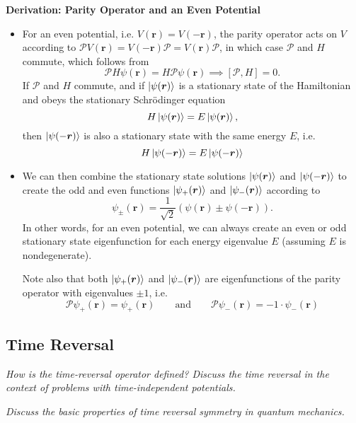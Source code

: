\documentclass[11pt, a4paper]{article}
\newcommand{\eqtext}[1]{\qquad \text{#1} \qquad}
\newcommand{\Schro}{Schr\"{o}dinger\xspace}
\newcommand{\Ham}{Hamiltonian\xspace}
\renewcommand{\vec}[1]{\bm{#1}}  %
\renewcommand{\r}{\vec{r}}  %
\newcommand{\Par}{\mathcal{P}}  %
\newcommand{\p}{\psi}  %
\renewcommand{\k}[1]{\ket{#1}}
\begin{document}
\textbf{Derivation: Parity Operator and an Even Potential}
\begin{itemize}
    \item For an even potential, i.e. $ V(\r) = V(-\r) $, the parity operator acts on $ V $ according to $ \Par V(\r) = V(-\r)\Par = V(\r)\Par $, in which case $ \Par $ and $ H $ commute, which follows from
	\begin{equation*}
		\Par H\p(\r) = H \Par \p(\r) \implies [\Par, H] = 0.
	\end{equation*}
	If $ \Par $ and $ H $ commute, and if $ \ket{\p(\r)} $ is a stationary state of the \Ham and obeys the stationary \Schro equation
	\begin{equation*}
		H\k{\p(\r)} = E \ket{\p(\r)},
	\end{equation*}
	then $ \ket{\p(-\r)} $ is also a stationary state with the same energy $ E $, i.e.
	\begin{equation*}
		H\k{\p(-\r)} = E \ket{\p(-\r)}
	\end{equation*}

	\item We can then combine the stationary state solutions $  \ket{\p(\r)} $ and $ \ket{\p(-\r)} $ to create the odd and even functions $  \ket{\p_{+}(\r)} $ and $ \k{\p_{-}(\r)} $ according to
	\begin{equation*}
		\p_{\pm}(\r) = \frac{1}{\sqrt{2}}\left(\p(\r) \pm \p(-\r)\right).
	\end{equation*}
	In other words, for an even potential, we can always create an even or odd stationary state eigenfunction for each energy eigenvalue $ E $ (assuming $ E $ is nondegenerate).
	
	Note also that both $  \ket{\p_{+}(\r)} $ and $ \k{\p_{-}(\r)} $ are eigenfunctions of the parity operator with eigenvalues $ \pm 1 $, i.e.
	\begin{equation*}
		\Par \p_{+}(\r) =  \p_{+}(\r) \eqtext{and} \Par \p_{-}(\r) =  -1 \cdot \p_{-}(\r)
	\end{equation*}
	
\end{itemize}

\subsection{Time Reversal}
\textit{How is the time-reversal operator defined? Discuss the time reversal in the context of problems with time-independent potentials.}

\textit{Discuss the basic properties of time reversal symmetry in quantum mechanics.}
\end{document}
